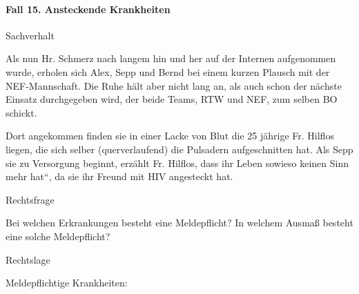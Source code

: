 \documentclass{article}
\begin{document}
\paragraph{Fall 15. Ansteckende Krankheiten}
Sachverhalt

Als nun Hr. Schmerz nach langem hin und her auf der Internen aufgenommen
wurde, erholen sich Alex, Sepp und Bernd bei einem kurzen Plausch mit
der NEF-Mannschaft. Die Ruhe h\"alt aber nicht lang an, als auch schon
der n\"achste Einsatz durchgegeben wird, der beide Teams, RTW und NEF,
zum selben BO schickt. 

Dort angekommen finden sie in einer Lacke von Blut die 25 j\"ahrige Fr.
Hilflos liegen, die sich selber (querverlaufend) die Pulsadern
aufgeschnitten hat. Als Sepp sie zu Versorgung beginnt, erz\"ahlt Fr.
Hilflos, dass ihr Leben {\quotedblbase}sowieso keinen Sinn mehr
hat{\textquotedblleft}, da sie ihr Freund mit HIV angesteckt hat.

Rechtsfrage

Bei welchen Erkrankungen besteht eine Meldepflicht? In welchem
Ausma{\ss} besteht eine solche Meldepflicht?

Rechtslage

Meldepflichtige Krankheiten:
\end{document}
